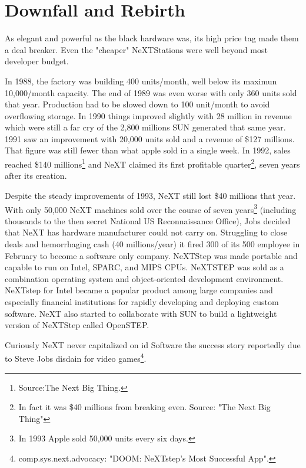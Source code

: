 \section{Downfall and Rebirth}
As elegant and powerful as the black hardware was, its high price tag made them a deal breaker. Even the "cheaper" NeXTStations were well beyond most developer budget.\\
\par
 In 1988, the factory was building 400 units/month, well below its maximun 10,000/month capacity. The end of 1989 was even worse with only 360 units sold that year. Production had to be slowed down to 100 unit/month to avoid overflowing storage. In 1990 things improved slightly with 28 million in revenue which were still a far cry of the 2,800 millions SUN generated that same year. 1991 saw an improvement with 20,000 units sold and a revenue of \$127 millions. That figure was still fewer than what apple sold in a single week. In 1992, sales reached \$140 millions\footnote{Source:The Next Big Thing.} and NeXT claimed its first profitable quarter\footnote{In fact it was \$40 millions from breaking even. Source: "The Next Big Thing"}, seven years after its creation.\\
\par
Despite the steady improvements of 1993, NeXT still lost \$40 millions that year. With only 50,000 NeXT machines sold over the course of seven years\footnote{In 1993 Apple sold 50,000 units every six days.} (including thousands to the then secret National US Reconnaissance Office), Jobs decided that NeXT has hardware manufacturer could not carry on. Struggling to close deals and hemorrhaging cash (40 millions/year) it fired 300 of its 500 employee in February to become a software only company. NeXTStep was made portable and capable to run on Intel, SPARC, and MIPS CPUs. NeXTSTEP was sold as a combination operating system and object-oriented development environment. NeXTstep for Intel became a popular product among large companies and especially financial institutions for rapidly developing and deploying custom software. NeXT also started to collaborate with SUN to build a lightweight version of NeXTStep called OpenSTEP.\\
\par
Curiously NeXT never capitalized on id Software the success story reportedly due to Steve Jobs disdain for video games\footnote{comp.sys.next.advocacy: "DOOM: NeXTstep's Most Successful App".}.\\
\par

